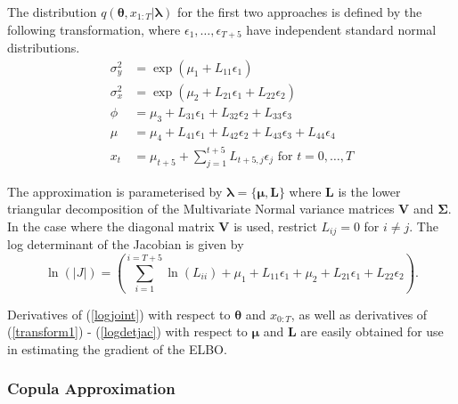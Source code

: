 \documentclass[12pt,a4paper]{article}%
\numberwithin{equation}{section}
\begin{document}
The distribution $q(\boldsymbol{\theta}, x_{1:T} | \boldsymbol{\lambda})$ for the first two approaches is defined by the following transformation, where $\epsilon_{1}, \dots, \epsilon_{T+5}$ have independent standard normal distributions.
\begin{align}
\sigma^2_y &= \exp(\mu_1 + L_{11} \epsilon_1)  \label{transform1} \\
\sigma^2_x &= \exp(\mu_2 + L_{21} \epsilon_1 + L_{22} \epsilon_2) \label{transform2} \\
\phi &= \mu_3 + L_{31} \epsilon_1 + L_{32} \epsilon_2 + L_{33} \epsilon_3 \label{transform3} \\
\mu &= \mu_4 + L_{41} \epsilon_1 + L_{42} \epsilon_2 + L_{43} \epsilon_3 + L_{44} \epsilon_4 \label{transform4} \\
x_t &= \mu_{t+5} + \sum_{j=1}^{t+5} L_{t+5, j} \epsilon_j \mbox{ for } t = 0, \dots, T \label{transform5} 
\end{align}

The approximation is parameterised by $\boldsymbol{\lambda} = \{ \boldsymbol{\mu}, \textbf{L} \}$ where $\textbf{L}$ is the lower triangular decomposition of the Multivariate Normal variance matrices $\textbf{V}$ and $\boldsymbol{\Sigma}$. In the case where the diagonal matrix $\textbf{V}$ is used, restrict $L_{ij} = 0$ for $i \neq j$.
The log determinant of the Jacobian is given by
\begin{equation}
\label{logdetjac}
\ln(|J|) = \left(\sum_{i = 1}^{i = T+5} \ln(L_{ii}) + \mu_1 + L_{11} \epsilon_1 + \mu_2 + L_{21} \epsilon_1 + L_{22} \epsilon_2\right).  
\end{equation}

Derivatives of (\ref{logjoint}) with respect to $\boldsymbol{\theta}$ and $x_{0:T}$, as well as derivatives of (\ref{transform1}) - (\ref{logdetjac}) with respect to $\boldsymbol{\mu}$ and $\textbf{L}$ are easily obtained for use in estimating the gradient of the ELBO.

\subsubsection{Copula Approximation}
\end{document}
